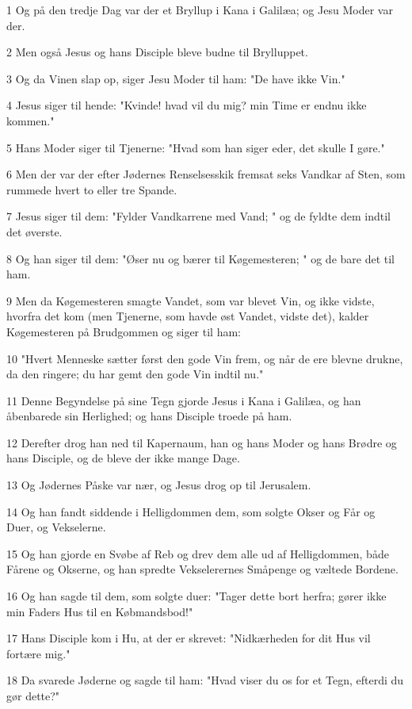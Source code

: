 \par 1 Og på den tredje Dag var der et Bryllup i Kana i Galilæa; og Jesu Moder var der.
\par 2 Men også Jesus og hans Disciple bleve budne til Brylluppet.
\par 3 Og da Vinen slap op, siger Jesu Moder til ham: "De have ikke Vin."
\par 4 Jesus siger til hende: "Kvinde! hvad vil du mig? min Time er endnu ikke kommen."
\par 5 Hans Moder siger til Tjenerne: "Hvad som han siger eder, det skulle I gøre."
\par 6 Men der var der efter Jødernes Renselsesskik fremsat seks Vandkar af Sten, som rummede hvert to eller tre Spande.
\par 7 Jesus siger til dem: "Fylder Vandkarrene med Vand; " og de fyldte dem indtil det øverste.
\par 8 Og han siger til dem: "Øser nu og bærer til Køgemesteren; " og de bare det til ham.
\par 9 Men da Køgemesteren smagte Vandet, som var blevet Vin, og ikke vidste, hvorfra det kom (men Tjenerne, som havde øst Vandet, vidste det), kalder Køgemesteren på Brudgommen og siger til ham:
\par 10 "Hvert Menneske sætter først den gode Vin frem, og når de ere blevne drukne, da den ringere; du har gemt den gode Vin indtil nu."
\par 11 Denne Begyndelse på sine Tegn gjorde Jesus i Kana i Galilæa, og han åbenbarede sin Herlighed; og hans Disciple troede på ham.
\par 12 Derefter drog han ned til Kapernaum, han og hans Moder og hans Brødre og hans Disciple, og de bleve der ikke mange Dage.
\par 13 Og Jødernes Påske var nær, og Jesus drog op til Jerusalem.
\par 14 Og han fandt siddende i Helligdommen dem, som solgte Okser og Får og Duer, og Vekselerne.
\par 15 Og han gjorde en Svøbe af Reb og drev dem alle ud af Helligdommen, både Fårene og Okserne, og han spredte Vekselerernes Småpenge og væltede Bordene.
\par 16 Og han sagde til dem, som solgte duer: "Tager dette bort herfra; gører ikke min Faders Hus til en Købmandsbod!"
\par 17 Hans Disciple kom i Hu, at der er skrevet: "Nidkærheden for dit Hus vil fortære mig."
\par 18 Da svarede Jøderne og sagde til ham: "Hvad viser du os for et Tegn, efterdi du gør dette?"
